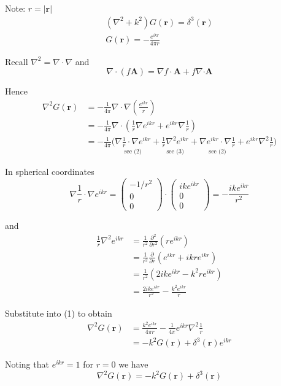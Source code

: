 


Note: $r=|\mathbf r|$
\begin{gather*}
\left(\nabla^2+k^2\right)G(\mathbf r)=\delta^3(\mathbf r)\tag{10.52}
\\
G(\mathbf r)=-\frac{e^{ikr}}{4\pi r}\tag{10.65}
\end{gather*}

Recall $\nabla^2=\nabla\cdot\nabla$ and
\begin{equation*}
\nabla\cdot(f\mathbf A)=\nabla f\cdot\mathbf A+f\nabla\mathbf\cdot\mathbf A
\end{equation*}

Hence
\begin{align*}
\nabla^2G(\mathbf r)&=-\frac{1}{4\pi}\nabla\cdot\nabla\left(\frac{e^{ikr}}{r}\right)
\\
&=-\frac{1}{4\pi}\nabla\cdot\left(\frac{1}{r}\nabla e^{ikr}+e^{ikr}\nabla\frac{1}{r}\right)
\\
&=-\frac{1}{4\pi}\biggl(
\underset{\text{see (2)}}{\nabla\frac{1}{r}\cdot\nabla e^{ikr}}
+\underset{\text{see (3)}}{\frac{1}{r}\nabla^2e^{ikr}}
+\underset{\text{see (2)}}{\nabla e^{ikr}\cdot\nabla\frac{1}{r}}
+e^{ikr}\nabla^2\frac{1}{r}
\biggr)\tag{1}
\end{align*}

In spherical coordinates
\begin{equation*}
\nabla\frac{1}{r}\cdot\nabla e^{ikr}
=\begin{pmatrix}-1/r^2\\0\\0\end{pmatrix}
\cdot\begin{pmatrix}ike^{ikr}\\0\\0\end{pmatrix}
=-\frac{ike^{ikr}}{r^2}\tag{2}
\end{equation*}

and
\begin{align*}
\frac{1}{r}\nabla^2e^{ikr}&=\frac{1}{r^2}\frac{\partial^2}{\partial r^2}(re^{ikr})
\\
&=\frac{1}{r^2}\frac{\partial}{\partial r}\left(e^{ikr}+ikre^{ikr}\right)
\\
&=\frac{1}{r^2}\left(2ike^{ikr}-k^2re^{ikr}\right)
\\
&=\frac{2ike^{ikr}}{r^2}-\frac{k^2e^{ikr}}{r}\tag{3}
\end{align*}

Substitute into (1) to obtain
\begin{align*}
\nabla^2G(\mathbf r)&=\frac{k^2e^{ikr}}{4\pi r}-\frac{1}{4\pi}e^{ikr}\nabla^2\frac{1}{r}
\\
&=-k^2G(\mathbf r)+\delta^3(\mathbf r)e^{ikr}
\end{align*}

Noting that $e^{ikr}=1$ for $r=0$ we have
\begin{equation*}
\nabla^2G(\mathbf r)=-k^2G(\mathbf r)+\delta^3(\mathbf r)\tag{4}
\end{equation*}


